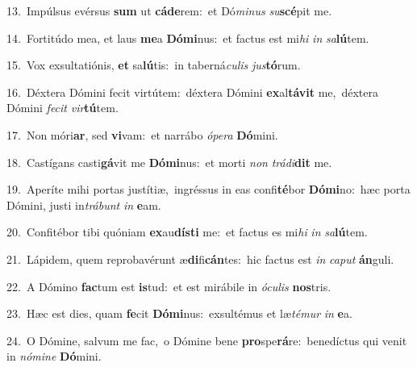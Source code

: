 {\numbfont\textcolor{\numbcolor}{13.}}~Impúlsus evérsus \textbf{sum} ut \textbf{cá}\-\textbf{de}rem:~\star et Dó\-\textit{mi}\-\textit{nus} \textit{su}\-\textbf{scé}pit me.\par
{\numbfont\textcolor{\numbcolor}{14.}}~Fortitúdo mea, et laus \textbf{me}\-a \textbf{Dó}\-\textbf{mi}nus:~\star et factus est mi\textit{hi} \textit{in} \textit{sa}\-\textbf{lú}tem.\par
{\numbfont\textcolor{\numbcolor}{15.}}~Vox exsultatiónis, \textbf{et} sa\-\textbf{lú}\-tis:~\star in taberná\-\textit{cu}\-\textit{lis} \textit{jus}\-\textbf{tó}rum.\par
{\numbfont\textcolor{\numbcolor}{16.}}~Déxtera Dómini fecit virtútem:~\dagger déxtera Dómini \textbf{ex}\-al\-\textbf{tá}\-\textbf{vit} me,~\star déxtera Dómini \textit{fe}\-\textit{cit} \textit{vir}\-\textbf{tú}tem.\par
{\numbfont\textcolor{\numbcolor}{17.}}~Non móri\-\textbf{ar}\-, sed \textbf{vi}\-vam:~\star et narrábo \textit{ó}\-\textit{pe}\textit{ra} \textbf{Dó}\-mini.\par
{\numbfont\textcolor{\numbcolor}{18.}}~Castígans casti\-\textbf{gá}\-vit me \textbf{Dó}\-\textbf{mi}nus:~\star et morti \textit{non} \textit{trá}\-\textit{di}\textbf{dit} me.\par
{\numbfont\textcolor{\numbcolor}{19.}}~Aperíte mihi portas justítiæ,~\dagger ingréssus in eas confi\-\textbf{té}\-bor \textbf{Dó}\-\textbf{mi}no:~\star hæc porta Dómini, justi in\-\textit{trá}\-\textit{bunt} \textit{in} \textbf{e}\-am.\par
{\numbfont\textcolor{\numbcolor}{20.}}~Confitébor tibi quóniam \textbf{ex}\-au\-\textbf{dís}\-\textbf{ti} me:~\star et factus es mi\textit{hi} \textit{in} \textit{sa}\-\textbf{lú}tem.\par
{\numbfont\textcolor{\numbcolor}{21.}}~Lápidem, quem reprobavérunt æ\-\textbf{di}\-fi\-\textbf{cán}\-tes:~\star hic factus est \textit{in} \textit{ca}\-\textit{put} \textbf{án}\-guli.\par
{\numbfont\textcolor{\numbcolor}{22.}}~A Dómino \textbf{fac}\-tum est \textbf{is}\-tud:~\star et est mirábile in \textit{ó}\-\textit{cu}\textit{lis} \textbf{nos}\-tris.\par
{\numbfont\textcolor{\numbcolor}{23.}}~Hæc est dies, quam \textbf{fe}\-cit \textbf{Dó}\-\textbf{mi}nus:~\star exsultémus et læ\-\textit{té}\-\textit{mur} \textit{in} \textbf{e}\-a.\par
{\numbfont\textcolor{\numbcolor}{24.}}~O Dómine, salvum me fac,~\dagger o Dómine bene \textbf{pro}\-spe\-\textbf{rá}\-re:~\star benedíctus qui venit in \textit{nó}\-\textit{mi}\textit{ne} \textbf{Dó}\-mini.\par

